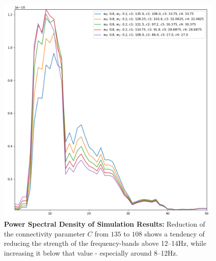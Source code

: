 \begin{figure}[H]
\includegraphics[width=15cm]{Figures/temp_sim_results}
\caption{\textbf{Power Spectral Density of Simulation Results:} Reduction of the connectivity parameter $C$
    from $135$ to $108$ shows a tendency of reducing the strength of the frequency-bands above 12--14Hz,
    while increasing it below that value - especially around 8--12Hz.}
\label{fig:sim_results1}
\end{figure}

